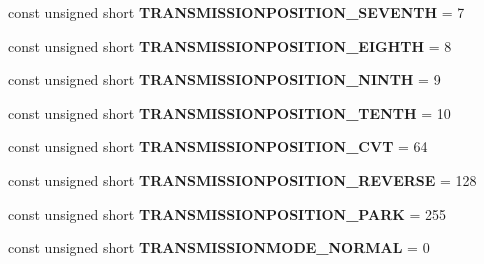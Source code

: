 \begin{DoxyCompactItemize}
\item 
\hypertarget{interfaceVehicle_1_1Transmission_a069238e8868109620bbf9b47b4ec259d}{const unsigned short {\bfseries T\-R\-A\-N\-S\-M\-I\-S\-S\-I\-O\-N\-P\-O\-S\-I\-T\-I\-O\-N\-\_\-\-S\-E\-V\-E\-N\-T\-H} = 7}\label{interfaceVehicle_1_1Transmission_a069238e8868109620bbf9b47b4ec259d}

\item 
\hypertarget{interfaceVehicle_1_1Transmission_a06bc688afc913b9c1ebe38e58085223a}{const unsigned short {\bfseries T\-R\-A\-N\-S\-M\-I\-S\-S\-I\-O\-N\-P\-O\-S\-I\-T\-I\-O\-N\-\_\-\-E\-I\-G\-H\-T\-H} = 8}\label{interfaceVehicle_1_1Transmission_a06bc688afc913b9c1ebe38e58085223a}

\item 
\hypertarget{interfaceVehicle_1_1Transmission_a88c2a8edf384ac8335aa2e9b81fa4b7d}{const unsigned short {\bfseries T\-R\-A\-N\-S\-M\-I\-S\-S\-I\-O\-N\-P\-O\-S\-I\-T\-I\-O\-N\-\_\-\-N\-I\-N\-T\-H} = 9}\label{interfaceVehicle_1_1Transmission_a88c2a8edf384ac8335aa2e9b81fa4b7d}

\item 
\hypertarget{interfaceVehicle_1_1Transmission_aa692fd63b8c4742b40d1a78d6a7c5d5f}{const unsigned short {\bfseries T\-R\-A\-N\-S\-M\-I\-S\-S\-I\-O\-N\-P\-O\-S\-I\-T\-I\-O\-N\-\_\-\-T\-E\-N\-T\-H} = 10}\label{interfaceVehicle_1_1Transmission_aa692fd63b8c4742b40d1a78d6a7c5d5f}

\item 
\hypertarget{interfaceVehicle_1_1Transmission_a753f0f63c62b986e4491854b9fb14e7d}{const unsigned short {\bfseries T\-R\-A\-N\-S\-M\-I\-S\-S\-I\-O\-N\-P\-O\-S\-I\-T\-I\-O\-N\-\_\-\-C\-V\-T} = 64}\label{interfaceVehicle_1_1Transmission_a753f0f63c62b986e4491854b9fb14e7d}

\item 
\hypertarget{interfaceVehicle_1_1Transmission_a2362fa1b5967e15ea9698230e4836271}{const unsigned short {\bfseries T\-R\-A\-N\-S\-M\-I\-S\-S\-I\-O\-N\-P\-O\-S\-I\-T\-I\-O\-N\-\_\-\-R\-E\-V\-E\-R\-S\-E} = 128}\label{interfaceVehicle_1_1Transmission_a2362fa1b5967e15ea9698230e4836271}

\item 
\hypertarget{interfaceVehicle_1_1Transmission_ac9464622230e358300876bf724101f7d}{const unsigned short {\bfseries T\-R\-A\-N\-S\-M\-I\-S\-S\-I\-O\-N\-P\-O\-S\-I\-T\-I\-O\-N\-\_\-\-P\-A\-R\-K} = 255}\label{interfaceVehicle_1_1Transmission_ac9464622230e358300876bf724101f7d}

\item 
\hypertarget{interfaceVehicle_1_1Transmission_a4453557684e5189a1df91127f7ae569e}{const unsigned short {\bfseries T\-R\-A\-N\-S\-M\-I\-S\-S\-I\-O\-N\-M\-O\-D\-E\-\_\-\-N\-O\-R\-M\-A\-L} = 0}\label{interfaceVehicle_1_1Transmission_a4453557684e5189a1df91127f7ae569e}


\end{DoxyCompactItemize}
